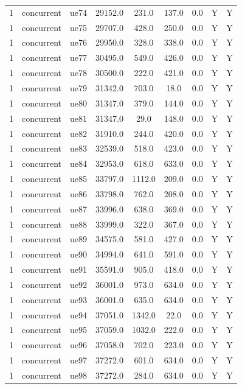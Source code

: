 \begin{table}[ht]
\begin{tabular}{|c|c|c|c|c|c|c|c|c|}
1 & concurrent & ue74 & 29152.0 & 231.0 & 137.0 & 0.0 & Y & Y \\
1 & concurrent & ue75 & 29707.0 & 428.0 & 250.0 & 0.0 & Y & Y \\
1 & concurrent & ue76 & 29950.0 & 328.0 & 338.0 & 0.0 & Y & Y \\
1 & concurrent & ue77 & 30495.0 & 549.0 & 426.0 & 0.0 & Y & Y \\
1 & concurrent & ue78 & 30500.0 & 222.0 & 421.0 & 0.0 & Y & Y \\
1 & concurrent & ue79 & 31342.0 & 703.0 & 18.0 & 0.0 & Y & Y \\
1 & concurrent & ue80 & 31347.0 & 379.0 & 144.0 & 0.0 & Y & Y \\
1 & concurrent & ue81 & 31347.0 & 29.0 & 148.0 & 0.0 & Y & Y \\
1 & concurrent & ue82 & 31910.0 & 244.0 & 420.0 & 0.0 & Y & Y \\
1 & concurrent & ue83 & 32539.0 & 518.0 & 423.0 & 0.0 & Y & Y \\
1 & concurrent & ue84 & 32953.0 & 618.0 & 633.0 & 0.0 & Y & Y \\
1 & concurrent & ue85 & 33797.0 & 1112.0 & 209.0 & 0.0 & Y & Y \\
1 & concurrent & ue86 & 33798.0 & 762.0 & 208.0 & 0.0 & Y & Y \\
1 & concurrent & ue87 & 33996.0 & 638.0 & 369.0 & 0.0 & Y & Y \\
1 & concurrent & ue88 & 33999.0 & 322.0 & 367.0 & 0.0 & Y & Y \\
1 & concurrent & ue89 & 34575.0 & 581.0 & 427.0 & 0.0 & Y & Y \\
1 & concurrent & ue90 & 34994.0 & 641.0 & 591.0 & 0.0 & Y & Y \\
1 & concurrent & ue91 & 35591.0 & 905.0 & 418.0 & 0.0 & Y & Y \\
1 & concurrent & ue92 & 36001.0 & 973.0 & 634.0 & 0.0 & Y & Y \\
1 & concurrent & ue93 & 36001.0 & 635.0 & 634.0 & 0.0 & Y & Y \\
1 & concurrent & ue94 & 37051.0 & 1342.0 & 22.0 & 0.0 & Y & Y \\
1 & concurrent & ue95 & 37059.0 & 1032.0 & 222.0 & 0.0 & Y & Y \\
1 & concurrent & ue96 & 37058.0 & 702.0 & 223.0 & 0.0 & Y & Y \\
1 & concurrent & ue97 & 37272.0 & 601.0 & 634.0 & 0.0 & Y & Y \\
1 & concurrent & ue98 & 37272.0 & 284.0 & 634.0 & 0.0 & Y & Y \\

\end{tabular}
\end{table}

